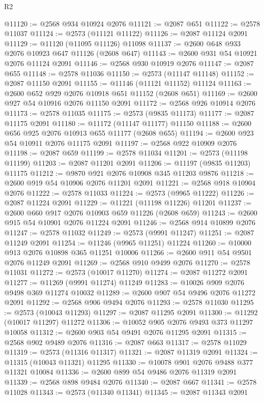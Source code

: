 \begin{lexlean}{R2}
\begin{coremodule}
@11120 := @2568 @934 @10924 @2076
@11121 := @2087 @651
@11122 := @2578 @11037
@11124 := @2573 (@11121 @11122)
@11126 := @2087 @11124 @2091
@11129 := @11120 (@11095 @11126) @11098
@11137 := @2600 @648 @933 @2076 @10923 @647 @11126 (@2608 @647)
@11143 := @2600 @931 @54 @10921 @2076 @11124 @2091
@11146 := @2568 @930 @10919 @2076
@11147 := @2087 @655
@11148 := @2578 @11036
@11150 := @2573 (@11147 @11148)
@11152 := @2087 @11150 @2091
@11155 := @11146 (@11121 @11152) @11124
@11163 := @2600 @652 @929 @2076 @10918 @651 @11152 (@2608 @651)
@11169 := @2600 @927 @54 @10916 @2076 @11150 @2091
@11172 := @2568 @926 @10914 @2076
@11173 := @2578 @11035
@11175 := @2573 (@9835 @11173)
@11177 := @2087 @11175 @2091
@11180 := @11172 (@11147 @11177) @11150
@11188 := @2600 @656 @925 @2076 @10913 @655 @11177 (@2608 @655)
@11194 := @2600 @923 @54 @10911 @2076 @11175 @2091
@11197 := @2568 @922 @10909 @2076
@11198 := @2087 @659
@11199 := @2578 @11034
@11201 := @2573 (@11198 @11199)
@11203 := @2087 @11201 @2091
@11206 := @11197 (@9835 @11203) @11175
@11212 := @9870 @921 @2076 @10908 @345 @11203 @9876
@11218 := @2600 @919 @54 @10906 @2076 @11201 @2091
@11221 := @2568 @918 @10904 @2076
@11222 := @2578 @11033
@11224 := @2573 (@9965 @11222)
@11226 := @2087 @11224 @2091
@11229 := @11221 (@11198 @11226) @11201
@11237 := @2600 @660 @917 @2076 @10903 @659 @11226 (@2608 @659)
@11243 := @2600 @915 @54 @10901 @2076 @11224 @2091
@11246 := @2568 @914 @10899 @2076
@11247 := @2578 @11032
@11249 := @2573 (@9991 @11247)
@11251 := @2087 @11249 @2091
@11254 := @11246 (@9965 @11251) @11224
@11260 := @10000 @913 @2076 @10898 @365 @11251 @10006
@11266 := @2600 @911 @54 @9501 @2076 @11249 @2091
@11269 := @2568 @910 @9499 @2076
@11270 := @2578 @11031
@11272 := @2573 (@10017 @11270)
@11274 := @2087 @11272 @2091
@11277 := @11269 (@9991 @11274) @11249
@11283 := @10026 @909 @2076 @9498 @369 @11274 @10032
@11289 := @2600 @907 @54 @9496 @2076 @11272 @2091
@11292 := @2568 @906 @9494 @2076
@11293 := @2578 @11030
@11295 := @2573 (@10043 @11293)
@11297 := @2087 @11295 @2091
@11300 := @11292 (@10017 @11297) @11272
@11306 := @10052 @905 @2076 @9493 @373 @11297 @10058
@11312 := @2600 @903 @54 @9491 @2076 @11295 @2091
@11315 := @2568 @902 @9489 @2076
@11316 := @2087 @663
@11317 := @2578 @11029
@11319 := @2573 (@11316 @11317)
@11321 := @2087 @11319 @2091
@11324 := @11315 (@10043 @11321) @11295
@11330 := @10078 @901 @2076 @9488 @377 @11321 @10084
@11336 := @2600 @899 @54 @9486 @2076 @11319 @2091
@11339 := @2568 @898 @9484 @2076
@11340 := @2087 @667
@11341 := @2578 @11028
@11343 := @2573 (@11340 @11341)
@11345 := @2087 @11343 @2091

\end{coremodule}
\end{lexlean}
